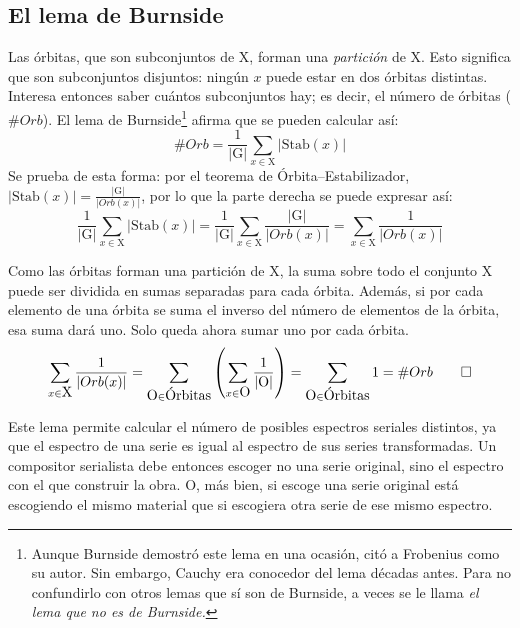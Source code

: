 	\subsection{El lema de Burnside}
		\label{burnside}
		Las órbitas, que son subconjuntos de X, forman una \emph{partición} de X. Esto significa que son subconjuntos disjuntos: ningún $x$ puede estar en dos órbitas distintas. Interesa entonces saber cuántos subconjuntos hay; es decir, el número de órbitas ($\#Orb$). El lema de Burnside\footnote{Aunque Burnside demostró este lema en una ocasión, citó a Frobenius como su autor. Sin embargo, Cauchy era conocedor del lema décadas antes. Para no confundirlo con otros lemas que sí son de Burnside, a veces se le llama \emph{el lema que no es de Burnside.}} afirma que se pueden calcular así:
		\[\#Orb=\frac{1}{|\mbox{G}|}\sum_{x\in\mbox{X}}|\mbox{Stab}(x)|\]	
		Se prueba de esta forma: por el teorema de Órbita--Estabilizador, $|\mbox{Stab}(x)|=\frac{|\mbox{G}|}{|Orb(x)|}$, por lo que la parte derecha se puede expresar así:
		\[\frac{1}{|\mbox{G}|}\sum_{x\in\mbox{X}}|\mbox{Stab}(x)|=
		\frac{1}{|\mbox{G}|}\sum_{x\in\mbox{X}}\frac{|\mbox{G}|}{|Orb(x)|}=
		\sum_{x\in\mbox{X}}\frac{1}{|Orb(x)|}\]

		Como las órbitas forman una partición de X, la suma sobre todo el conjunto X puede ser dividida en sumas separadas para cada órbita. Además, si por cada elemento de una órbita se suma el inverso del número de elementos de la órbita, esa suma dará uno. Solo queda ahora sumar uno por cada órbita.
		\[\sum_{x\in\mbox{X}}\frac{1}{|Orb(x)|}=\sum_{\mbox{O}\in\mbox{Órbitas}}\left(\sum_{x\in\mbox{O}}\frac{1}{|\mbox{O}|}\right)=\sum_{\mbox{O}\in\mbox{Órbitas}}1=\#Orb \qed\]	
	
		Este lema permite calcular el número de posibles espectros seriales distintos, ya que el espectro de una serie es igual al espectro de sus series transformadas. Un compositor serialista debe entonces escoger no una serie original, sino el espectro con el que construir la obra. O, más bien, si escoge una serie original está escogiendo el mismo material que si escogiera otra serie de ese mismo espectro.